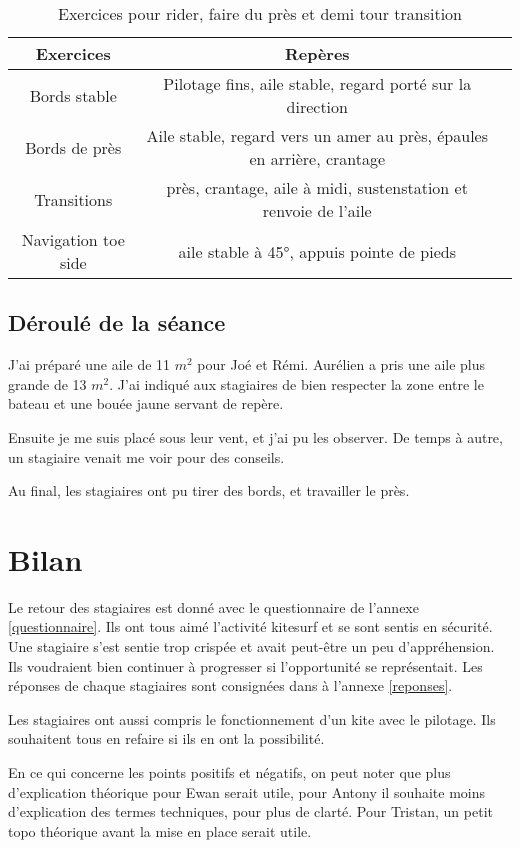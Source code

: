 \documentclass[11pt,a4paper]{report}
\begin{document}
\begin{table}[h]
\begin{tabular}{|c|c|c|}
\hline
\textbf{Exercices}     &  \textbf{Repères}      \\
\hline 
Bords stable & Pilotage fins, aile stable, regard porté sur la direction   \\
\hline
Bords de près  & Aile stable, regard vers un amer au près, épaules en arrière, crantage  \\
\hline 
Transitions & près, crantage, aile à midi, sustenstation et renvoie de l'aile \\
\hline
Navigation toe side   &  aile stable à 45°, appuis pointe de pieds   \\
\hline
\end{tabular}
\caption{Exercices pour rider, faire du près et demi tour transition\label{seance_pilotage2}}
\end{table}

\subsection{Déroulé de la séance}
J'ai préparé une aile de 11 $m^2$ pour Joé et Rémi. Aurélien a pris une aile plus
grande de 13 $m^2$. J'ai indiqué aux stagiaires de bien respecter
la zone entre le bateau et une bouée jaune servant de repère.

Ensuite je me suis placé sous leur vent, et j'ai pu les observer. 
De temps à autre, un stagiaire venait me voir pour des conseils.

Au final, les stagiaires ont pu tirer des bords, et travailler le près. 

\section{Bilan}
Le retour des stagiaires est donné avec le questionnaire de l'annexe \ref{questionnaire}.
Ils ont tous aimé l'activité kitesurf et se sont sentis en sécurité.
Une stagiaire s'est sentie trop crispée et avait peut-\^etre un peu d'appréhension.
Ils  voudraient bien continuer à progresser si l'opportunité se représentait.
Les réponses de chaque stagiaires sont consignées dans à l'annexe \ref{reponses}.

Les stagiaires ont aussi compris le fonctionnement d'un kite avec le pilotage.
Ils souhaitent tous en refaire si ils en ont la possibilité.

En ce qui concerne les points positifs et négatifs, on peut noter
que plus d'explication théorique pour Ewan serait utile, pour Antony
il souhaite moins d'explication des termes techniques, pour plus de clarté.
Pour Tristan, un petit topo théorique avant la mise en place serait utile.
\end{document}
